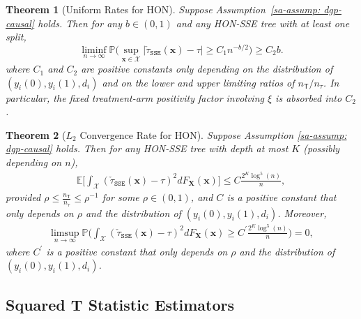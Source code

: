 \documentclass[10pt]{article}
\def\treeT{\mathsf{T}}
\def\bx{\mathbf{x}}
\def\bX{\mathbf{X}}
\def\X{\mathcal{X}}
\def\E{\mathbb{E}}
\def\P{\mathbb{P}}
\newtheorem{theorem}{Theorem}%
\theoremstyle{definition}
\theoremstyle{remark}
\begin{document}
\begin{theorem}[Uniform Rates for HON]\label{sa-thm: honest output reg fit}
Suppose Assumption~\ref{sa-assump: dgp-causal} holds. Then for any $b \in (0, 1) $ and any HON-SSE tree with at least one split,
\begin{equation*}
    \liminf_{n\to\infty} \mathbb{P}\Bigg(\sup_{\bx\in\mathcal{X}}|\check\tau_{\mathtt{SSE}}(\bx) - \tau| \geq C_1 n^{-b/2} \Bigg) \geq C_2 b.
\end{equation*}
where $C_1$ and $C_2$ are positive constants only depending on the distribution
of $(y_i(0),y_i(1),d_i)$ and on the lower and upper limiting ratios of
$n_{\treeT}/n_{\tau}$. In particular, the fixed treatment-arm positivity factor
involving $\xi$ is absorbed into $C_2$.
\end{theorem}



\begin{theorem}[$L_2$ Convergence Rate for HON]\label{sa-thm: L2 consistency honest fit}
Suppose Assumption \ref{sa-assump: dgp-causal} holds. Then for any HON-SSE tree with depth at most $K$ (possibly depending on $n$),
\begin{align*}
    \E \bigg[ \int_{\X} (\check\tau_{\mathtt{SSE}}(\bx) - \tau)^2 dF_{\bX}(\bx)\bigg] \leq C \frac{2^K \log^5(n)}{n},
\end{align*}
provided $\rho \leq \frac{n_{\treeT}}{n_{\tau}} \leq \rho^{-1}$ for some $\rho \in (0,1)$, and $C$ is a positive constant that only depends on $\rho$ and the distribution of $(y_i(0), y_i(1), d_i)$. Moreover, 
\begin{align*}
    \limsup_{n \to \infty} \P \bigg( \int_{\X} (\check\tau_{\mathtt{SSE}}(\bx) - \tau)^2 dF_{\bX}(\bx) \geq C^{\prime} \frac{2^K \log^5(n)}{n}\bigg) = 0,
\end{align*}
where $C^{\prime}$ is a positive constant that only depends on $\rho$ and the distribution of $(y_i(0), y_i(1), d_i)$. 
\end{theorem}


\subsection{Squared T Statistic Estimators}\label{sa-sec: tstat estimators}
\end{document}
